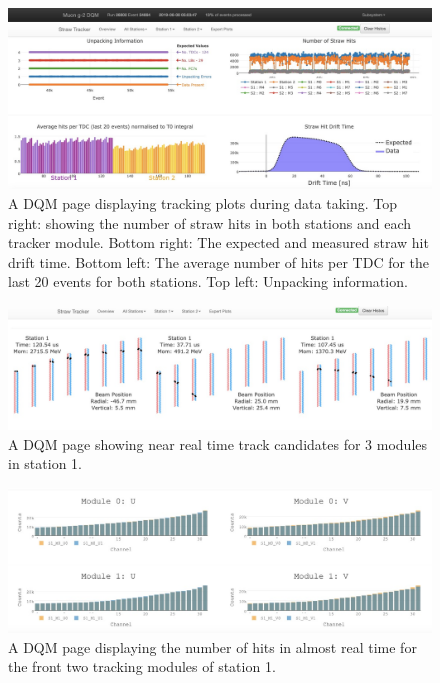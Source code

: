 \begin{figure}[th]
\centering
\includegraphics[scale=0.3]{Figures/DQMoverview.jpeg}
\decoRule
\caption{A DQM page displaying tracking plots during data taking. Top right: showing the number of straw hits in both stations and each tracker module. Bottom right: The expected and measured straw hit drift time. Bottom left: The average number of hits per TDC for the last 20 events for both stations. Top left: Unpacking information.}
\label{fig:DQMoverview}
\end{figure}

\begin{figure}[th]
\centering
\includegraphics[scale=0.3]{Figures/DQMtracks.jpeg}
\decoRule
\caption{A DQM page showing near real time track candidates for 3 modules in station 1.}
\label{fig:DQMtracks}
\end{figure}

\begin{figure}[th]
\centering
\includegraphics[scale=0.3]{Figures/DQMhits.jpeg}
\decoRule
\caption{A DQM page displaying the number of hits in almost real time for the front two tracking modules of station 1.}
\label{fig:DQMhits}
\end{figure}

